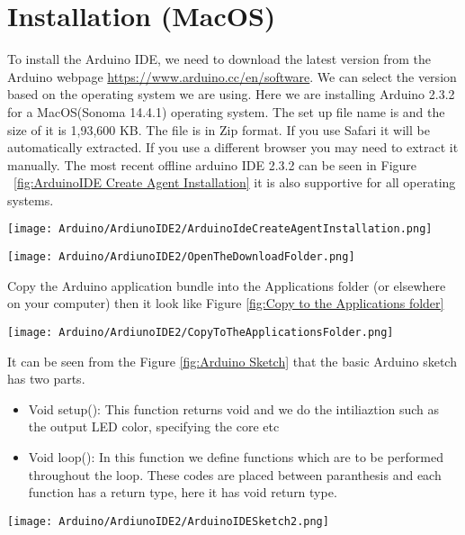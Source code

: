 	
\section{Installation (MacOS)}
	
	To install the Arduino IDE, we need to download the latest version from the Arduino webpage \url{https://www.arduino.cc/en/software}. We can select the version based on the operating system we are using. Here we are installing Arduino 2.3.2 for a MacOS(Sonoma 14.4.1) operating system. The set up file name is  and the size of it is 1,93,600 KB. The file is in Zip format. If you use Safari it will be automatically extracted. If you use a different browser you may need to extract it manually. The most recent offline arduino IDE 2.3.2 can be seen in Figure ~\ref{fig:ArduinoIDE Create Agent Installation} it is also supportive for all operating systems.
	
		\begin{center}
			
			\texttt{[image: Arduino/ArdiunoIDE2/ArduinoIdeCreateAgentInstallation.png]}
			\label{fig:ArduinoIDE Create Agent Installation}
		\end{center}
		
		\begin{center}
			\texttt{[image: Arduino/ArdiunoIDE2/OpenTheDownloadFolder.png]}
		\end{center}
		
	Copy the Arduino application bundle into the Applications folder (or elsewhere on your computer) then it look like Figure \ref{fig:Copy to the Applications folder}
		
		\begin{center}
			
			\texttt{[image: Arduino/ArdiunoIDE2/CopyToTheApplicationsFolder.png]}
			\label{fig:Copy to the Applications folder}
		\end{center}
		
	It can be seen from the Figure \ref{fig:Arduino Sketch} that the basic Arduino sketch has two parts. 
	
	\begin{itemize}
		\item Void setup(): This function returns void and we do the intiliaztion such as the output LED color, specifying the core etc
		\item Void loop(): In this function we define functions which are to be performed throughout the loop. These codes are placed between paranthesis {} and each function has a return type, here it has void return type.
	\end{itemize}
	
	\begin{center}
		\label{fig:Arduino Sketch}
		\texttt{[image: Arduino/ArdiunoIDE2/ArduinoIDESketch2.png]}
	\end{center}